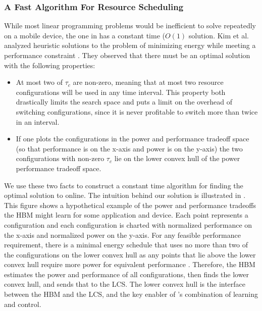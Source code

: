 \subsubsection{A Fast Algorithm For Resource Scheduling}
While most linear programming problems would be inefficient to solve
repeatedly on a mobile device, the one in  has a
constant time ($O(1)$ solution.  Kim et al. analyzed heuristic
solutions to the problem of minimizing energy while meeting a
performance constraint \cite{kim-cpsna}.  They observed that there
must be an optimal solution with the following properties:
\begin{itemize}
\item At most two of $\tau_c$ are non-zero, meaning that at most two
  resource configurations will be used in any time interval.  This
  property both drastically limits the search space and puts a limit
  on the overhead of switching configurations, since it is never
  profitable to switch more than twice in an interval.
\item If one plots the configurations in the power and performance
  tradeoff space (so that performance is on the x-axis and power is on
  the y-axis) the two configurations with non-zero $\tau_c$ lie on the
  lower convex hull of the power performance tradeoff space.
\end{itemize}
We use these two facts to construct a constant time algorithm for
finding the optimal solution to  online.  The
intuition behind our solution is illustrated in .
This figure shows a hypothetical example of the power and performance
tradeoffs the HBM might learn for some application and device.  Each
point represents a configuration and each configuration is charted
with normalized performance on the x-axis and normalized power on the
y-axis.  For any feasible performance requirement, there is a minimal
energy schedule that uses no more than two of the configurations on
the lower convex hull as any points that lie above the lower convex
hull require more power for equivalent performance \cite{kim-cpsna}.
Therefore, the HBM estimates the power and performance of all
configurations, then finds the lower convex hull, and sends that to
the LCS.  The lower convex hull is the interface between the HBM and
the LCS, and the key enabler of \SYSTEM{}'s combination of learning
and control.

